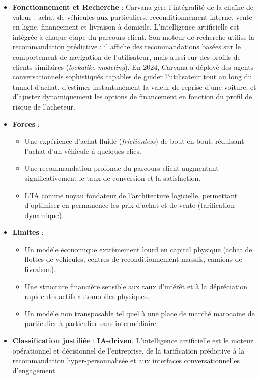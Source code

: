 \documentclass[11pt,a4paper]{article}
\begin{document}
\begin{itemize}
    \item \textbf{Fonctionnement et Recherche} : Carvana gère l'intégralité de la chaîne de valeur : achat de véhicules aux particuliers, reconditionnement interne, vente en ligne, financement et livraison à domicile. L'intelligence artificielle est intégrée à chaque étape du parcours client. Son moteur de recherche utilise la recommandation prédictive : il affiche des recommandations basées sur le comportement de navigation de l'utilisateur, mais aussi sur des profils de clients similaires (\textit{lookalike modeling}). En 2024, Carvana a déployé des agents conversationnels sophistiqués capables de guider l'utilisateur tout au long du tunnel d'achat, d'estimer instantanément la valeur de reprise d'une voiture, et d'ajuster dynamiquement les options de financement en fonction du profil de risque de l'acheteur.
    \item \textbf{Forces} :
    \begin{itemize}
        \item Une expérience d'achat fluide (\textit{frictionless}) de bout en bout, réduisant l'achat d'un véhicule à quelques clics.
        \item Une recommandation profonde du parcours client augmentant significativement le taux de conversion et la satisfaction.
        \item L'IA comme noyau fondateur de l'architecture logicielle, permettant d'optimiser en permanence les prix d'achat et de vente (tarification dynamique).
    \end{itemize}
    \item \textbf{Limites} :
    \begin{itemize}
        \item Un modèle économique extrêmement lourd en capital physique (achat de flottes de véhicules, centres de reconditionnement massifs, camions de livraison).
        \item Une structure financière sensible aux taux d'intérêt et à la dépréciation rapide des actifs automobiles physiques.
        \item Un modèle non transposable tel quel à une place de marché marocaine de particulier à particulier sans intermédiaire.
    \end{itemize}
    \item \textbf{Classification justifiée} : \textbf{IA-driven}. L'intelligence artificielle est le moteur opérationnel et décisionnel de l'entreprise, de la tarification prédictive à la recommandation hyper-personnalisée et aux interfaces conversationnelles d'engagement.
\end{itemize}
\end{document}
